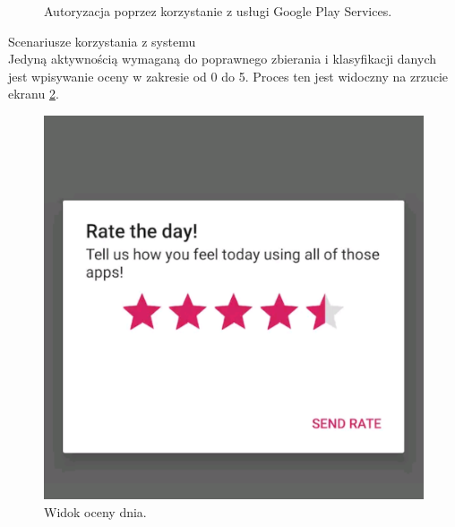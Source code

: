 \documentclass[a4paper,twoside,12pt]{book}
\begin{document}
\begin{description}
\begin{figure}[h!]
    \caption{Autoryzacja poprzez korzystanie z usługi Google Play Services.\protect\footnotemark}
    \label{fig:auth_screen}
\end{figure}

\item Scenariusze korzystania z systemu \hfill \\ 
Jedyną aktywnością wymaganą do poprawnego zbierania i klasyfikacji danych jest wpisywanie oceny w zakresie od 0 do 5. Proces ten jest widoczny na zrzucie ekranu \ref{fig:rate_screen}. 
\begin{figure}[h!]
    \centering
    \includegraphics[scale=0.1]{images/rate_screen.png}
    \caption{Widok oceny dnia.\protect\footnotemark}
    \label{fig:rate_screen}
\end{figure}


\end{description}
\end{document}

